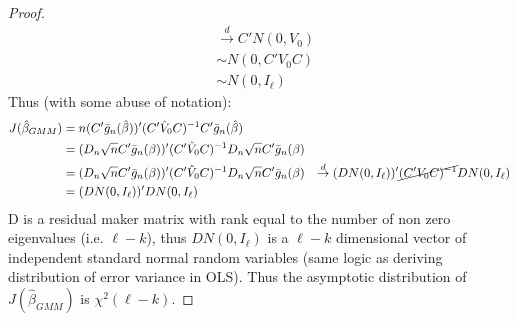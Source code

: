 \documentclass[DIV=14,titlepage=false]{scrreprt}
\begin{document}
\begin{proof}
\begin{align*}
        &\overset{d}{\to}C'N(0,V_0)\\
        &\sim N(0,C'V_0 C)\\
        &\sim N(0,I_{\ell})
    \end{align*}
    Thus (with some abuse of notation):
    \begin{align*}
        J(\hat\beta_{GMM}) &= n(C' \bar g_n(\hat \beta))'(C' \hat V_0 C)^{-1} C' \bar g_n(\hat \beta)\\
        & =(D_n \sqrt{n} C' \bar g_n(\beta))'(C' \hat V_0 C)^{-1} D_n \sqrt{n} C' \bar g_n(\beta)\\
        &= (D_n \sqrt{n} C' \bar g_n(\beta))'(C' \hat V_0 C)^{-1} D_n \sqrt{n} C' \bar g_n(\beta)
        &\overset{d}{\to} (D N(0,I_{\ell}))'\cancel{(C' V_0 C)^{-1}} D N(0,I_{\ell})\\
        &= (D N(0,I_{\ell}))' D N(0,I_{\ell})
    \end{align*}
    D is a residual maker matrix with rank equal to the number of non zero eigenvalues (i.e. $\ell-k$), thus $D N(0,I_{\ell})$ is a $\ell-k$ dimensional vector of independent standard normal random variables (same logic as deriving distribution of error variance in OLS). Thus the asymptotic distribution of $J(\hat\beta_{GMM})$ is $\chi^2(\ell-k)$.
\end{proof}
\end{document}
